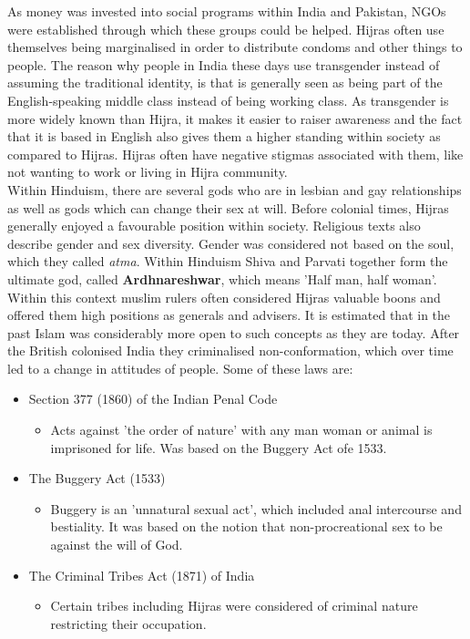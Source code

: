 \documentclass{article}
\begin{document}
	As money was invested into social programs within India and Pakistan, NGOs were established through which these groups could be helped. Hijras often use themselves being marginalised in order to distribute condoms and other things to people. The reason why people in India these days use transgender instead of assuming the traditional identity, is that is generally seen as being part of the English-speaking middle class instead of being working class. As transgender is more widely known than Hijra, it makes it easier to raiser awareness and the fact that it is based in English also gives them a higher standing within society as compared to Hijras. Hijras often have negative stigmas associated with them, like not wanting to work or living in Hijra community. \\
	Within Hinduism, there are several gods who are in lesbian and gay relationships as well as gods which can change their sex at will. Before colonial times, Hijras generally enjoyed a favourable position within society. Religious texts also describe gender and sex diversity. Gender was considered not based on the soul, which they called \textit{atma}. Within Hinduism Shiva and Parvati together form the ultimate god, called \textbf{Ardhnareshwar}, which means 'Half man, half woman'. Within this context muslim rulers often considered Hijras valuable boons and offered them high positions as generals and advisers. It is estimated that in the past Islam was considerably more open to such concepts as they are today. After the British colonised India they criminalised non-conformation, which over time led to a change in attitudes of people. Some of these laws are:
	\begin{itemize}
		\item{Section 377 (1860) of the Indian Penal Code}
		\begin{itemize}
			\item{Acts against 'the order of nature' with any man woman or animal is imprisoned for life. Was based on the Buggery Act ofe 1533.}
		\end{itemize}
		\item{The Buggery Act (1533)}
		\begin{itemize}
			\item{Buggery is an 'unnatural sexual act', which included anal intercourse and bestiality. It was based on the notion that non-procreational sex to be against the will of God.}
		\end{itemize}
		\item{The Criminal Tribes Act (1871) of India}
		\begin{itemize}
			\item{Certain tribes including Hijras were considered of criminal nature restricting their occupation.}
		\end{itemize}
	\end{itemize}
\end{document}
